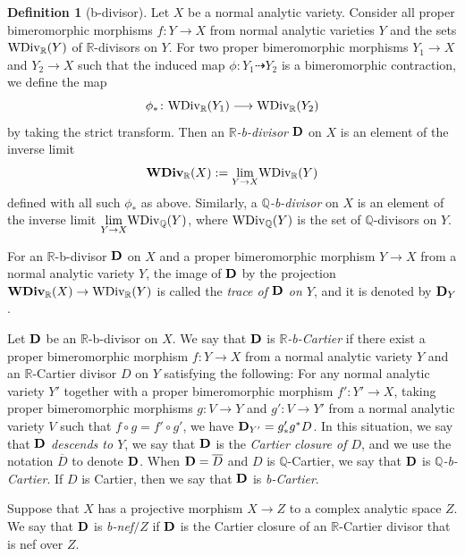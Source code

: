 \documentclass[12pt]{amsart}
\theoremstyle{definition}
\newtheorem{defn}[thm]{Definition}
\begin{document}
\begin{defn}[b-divisor]\label{defn--b-divisor}
Let $X$ be a normal analytic variety. 
Consider all proper bimeromorphic morphisms $f \colon Y \to X$ from normal analytic varieties $Y$ and the sets ${\rm WDiv}_{\mathbb{R}}(Y)$ of $\mathbb{R}$-divisors on $Y$. 
For two proper bimeromorphic morphisms $Y_{1} \to X$ and $Y_{2} \to X$ such that the induced map $\phi \colon Y_{1} \dashrightarrow Y_{2}$ is a bimeromorphic contraction, we define the map
$$\phi_{*} \colon {\rm WDiv}_{\mathbb{R}}(Y_{1}) \longrightarrow {\rm WDiv}_{\mathbb{R}}(Y_{2})$$
by taking the strict transform. 
Then an {\em $\mathbb{R}$-b-divisor} $\boldsymbol{\rm D}$ on $X$ is an element of the inverse limit
$$\boldsymbol{\rm WDiv}_{\mathbb{R}}(X):=\underset{Y \to X}{\rm lim}{\rm WDiv}_{\mathbb{R}}(Y)$$
defined with all such $\phi_{*}$ as above. 
Similarly, a {\em $\mathbb{Q}$-b-divisor} on $X$ is an element of the inverse limit $\underset{Y \to X}{\rm lim}{\rm WDiv}_{\mathbb{Q}}(Y)$, where ${\rm WDiv}_{\mathbb{Q}}(Y)$  is the set of $\mathbb{Q}$-divisors on $Y$. 

For an $\mathbb{R}$-b-divisor $\boldsymbol{\rm D}$ on $X$ and a proper bimeromorphic morphism $Y \to X$ from a normal analytic variety $Y$, the image of $\boldsymbol{\rm D}$ by the projection $\boldsymbol{\rm WDiv}_{\mathbb{R}}(X) \to {\rm WDiv}_{\mathbb{R}}(Y)$ is called the {\em trace of $\boldsymbol{\rm D}$ on $Y$}, and it is denoted by $\boldsymbol{\rm D}_{Y}$. 

Let $\boldsymbol{\rm D}$ be an $\mathbb{R}$-b-divisor on $X$. 
We say that $\boldsymbol{\rm D}$ is {\em $\mathbb{R}$-b-Cartier} if there exist a proper bimeromorphic morphism $f \colon Y \to X$ from a normal analytic variety $Y$ and an $\mathbb{R}$-Cartier divisor $D$ on $Y$ satisfying the following: 
For any normal analytic variety $Y'$ together with a proper bimeromorphic morphism $f' \colon Y' \to X$, taking  proper bimeromorphic morphisms $g \colon V \to Y$ and $g' \colon V \to Y'$ from a normal analytic variety $V$ such that $f \circ g = f' \circ g'$, we have $\boldsymbol{\rm D}_{Y'}=g'_{*}g^{*}D$. 
In this situation, we say that {\em $\boldsymbol{\rm D}$ descends to $Y$}, we say that $\boldsymbol{\rm D}$ is the {\em Cartier closure of $D$}, and we use the notation $\overline{D}$ to denote $\boldsymbol{\rm D}$. 
When $\boldsymbol{\rm D}=\overline{D}$ and $D$ is $\mathbb{Q}$-Cartier, we say that $\boldsymbol{\rm D}$ is {\em $\mathbb{Q}$-b-Cartier}. 
If $D$ is Cartier, then we say that $\boldsymbol{\rm D}$ is {\em b-Cartier}. 

Suppose that $X$ has a projective morphism $X\to Z$ to a complex analytic space $Z$. 
We say that $\boldsymbol{\rm D}$ is {\em b-nef$/Z$} if $\boldsymbol{\rm D}$ is the Cartier closure of an $\mathbb{R}$-Cartier divisor that is nef over $Z$.   
\end{defn}
\end{document}
